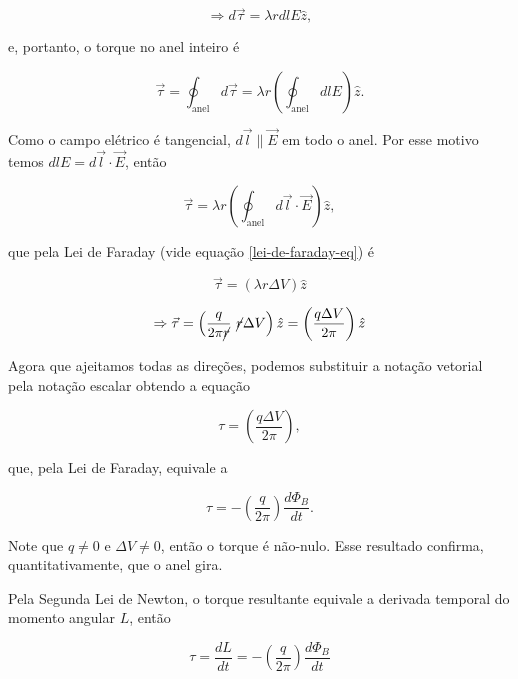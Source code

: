 \documentclass[
	article,
	11pt,
	oneside,
	a4paper,
	english,
	brazil,
	sumario=tradicional
	]{abntex2}
\begin{document}
\begin{equation}
    \Rightarrow d \vec{\tau} = \lambda r dl E \hat{z},
\end{equation}

\noindent e, portanto, o torque no anel inteiro é

\begin{equation}
    \vec{\tau} = \oint_{\text{anel}} d \vec{\tau} = \lambda r \left(\oint_{\text{anel}} dl E\right) \hat{z}.
\end{equation}

Como o campo elétrico é tangencial, $d\vec{l} \parallel \vec{E}$ em todo o anel. Por esse motivo temos $dl E = d\vec{l} \cdot \vec{E} $, então

\begin{equation}
    \vec{\tau} = \lambda r \left(\oint_{\text{anel}} d\vec{l} \cdot \vec{E}\right) \hat{z},
\end{equation}

\noindent que pela Lei de Faraday (vide equação \ref{lei-de-faraday-eq}) é

\begin{equation}
    \vec{\tau} = \left(\lambda r \Delta V \right) \hat{z}
\end{equation}

\begin{equation}
    \Rightarrow \vec{\tau} = \left(\frac{q}{2\pi \cancel{r}}~\cancel{r} \Delta V \right) \hat{z} = \left(\frac{q \Delta V}{2\pi}\right) \hat{z}
\end{equation}

Agora que ajeitamos todas as direções, podemos substituir a notação vetorial pela notação escalar obtendo a equação

\begin{equation}
    \tau =  \left(\frac{q \Delta V}{2\pi}\right),
\end{equation}

\noindent que, pela Lei de Faraday, equivale a

\begin{equation}
    \tau =  - \left(\frac{q}{2\pi}\right)\frac{d \Phi_B}{d t}.
\end{equation}

Note que $q \ne 0$ e $\Delta V \ne 0$, então o torque é não-nulo. Esse resultado confirma, quantitativamente, que o anel gira.

Pela Segunda Lei de Newton, o torque resultante equivale a derivada temporal do momento angular $L$, então

\begin{equation}
    \tau = \frac{dL}{dt} =  - \left(\frac{q}{2\pi}\right)\frac{d\Phi_B}{dt}
\end{equation}
\end{document}
